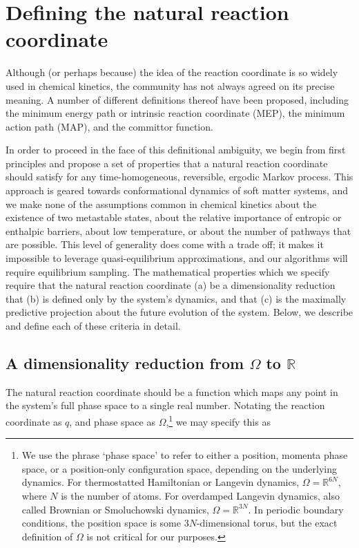 \documentclass[aip, jcp, reprint, nolinenumbers, twocolumn, nobalancelastpage, nofootinbib]{revtex4-1}
\begin{document}
\section{Defining the natural reaction coordinate}

Although (or perhaps because) the idea of the reaction coordinate is so widely used in chemical kinetics, the community has not always agreed on its precise meaning. A number of different definitions thereof have been proposed, including the minimum energy path or intrinsic reaction coordinate (MEP),\cite{fukui1970formulation, tachibana1980novel, quapp1984analysis, yamashita1981irc} the minimum action path (MAP),\cite{olender1997yet, heymann2008geometric, eastman2001simulation, ren2004minimum, lipfert2005protein} and the committor function.\cite{Bolhuis2002TRANSITION, dellago2002transition}

In order to proceed in the face of this definitional ambiguity, we begin from first principles and propose a set of properties that a natural reaction coordinate should satisfy for any time-homogeneous, reversible, ergodic Markov process. This approach is geared towards conformational dynamics of soft matter systems, and we make none of the assumptions common in chemical kinetics about the existence of two metastable states, about the relative importance of entropic or enthalpic barriers, about low temperature, or about the number of pathways that are possible. This level of generality does come with a trade off; it makes it impossible to leverage quasi-equilibrium approximations, and our algorithms will require equilibrium sampling. The mathematical properties which we specify require that the natural reaction coordinate (a) be a dimensionality reduction that (b) is defined only by the system's dynamics, and that (c) is the maximally predictive projection about the future evolution of the system. Below, we describe and define each of these criteria in detail.

\subsection{A dimensionality reduction from $\Omega$ to $\mathbb{R}$}

The natural reaction coordinate should be a function which maps any point in the system's full phase space to a single real number. Notating the reaction coordinate as $q$, and phase space as $\Omega$,\footnote{We use the phrase `phase space' to refer to either a position, momenta phase space, or a position-only configuration space, depending on the underlying dynamics. For thermostatted Hamiltonian or Langevin dynamics, $\Omega=\mathbb{R}^{6N}$, where $N$ is the number of atoms. For overdamped Langevin dynamics, also called Brownian or Smoluchowski dynamics, $\Omega=\mathbb{R}^{3N}$. In periodic boundary conditions, the position space is some $3N$-dimensional torus, but the exact definition of $\Omega$ is not critical for our purposes.} we may specify this as
\end{document}

